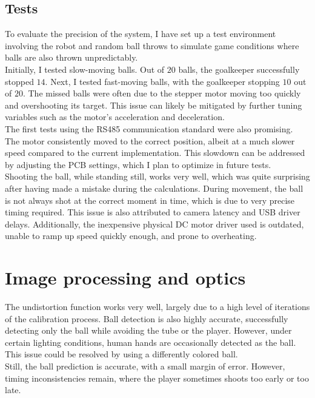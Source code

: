 \subsection{Tests}\label{subsec:tests}
To evaluate the precision of the system, I have set up a test environment involving the robot and random ball throws to simulate game conditions where balls are also thrown unpredictably.\\
Initially, I tested slow-moving balls.
Out of $20$ balls, the goalkeeper successfully stopped $14$.
Next, I tested fast-moving balls, with the goalkeeper stopping $10$ out of $20$.
The missed balls were often due to the stepper motor moving too quickly and overshooting its target.
This issue can likely be mitigated by further tuning variables such as the motor's acceleration and deceleration.\\
The first tests using the RS485 communication standard were also promising.
The motor consistently moved to the correct position, albeit at a much slower speed compared to the current implementation.
This slowdown can be addressed by adjusting the PCB settings, which I plan to optimize in future tests.\\
Shooting the ball, while standing still, works very well, which was quite surprising after having made a mistake during the calculations.
During movement, the ball is not always shot at the correct moment in time, which is due to very precise timing required.
This issue is also attributed to camera latency and USB driver delays.
Additionally, the inexpensive physical DC motor driver used is outdated, unable to ramp up speed quickly enough, and prone to overheating.


\section{Image processing and optics}\label{sec:results_image}
The undistortion function works very well, largely due to a high level of iterations of the calibration process.
Ball detection is also highly accurate, successfully detecting only the ball while avoiding the tube or the player.
However, under certain lighting conditions, human hands are occasionally detected as the ball.
This issue could be resolved by using a differently colored ball.\\
Still, the ball prediction is accurate, with a small margin of error.
However, timing inconsistencies remain, where the player sometimes shoots too early or too late.

